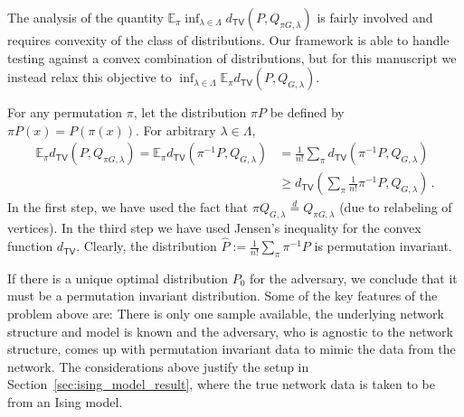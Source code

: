\documentclass[final,12pt]{colt2018}
\begin{document}
The analysis of the quantity $\mathbb{E}_\pi  \inf_{\lambda\in \Lambda} d_{\mathsf{TV}}(P, Q_{\pi G,\lambda})$ is fairly involved and requires convexity of the class of distributions. Our framework is able to handle testing against a convex combination of distributions, but for this manuscript we instead relax this objective to $\inf_{\lambda \in \Lambda} \mathbb{E}_{\pi} d_{\mathsf{TV}}(P, Q_{G,\lambda})$.
%

For any permutation $\pi$, let the distribution $\pi P$ be defined by $\pi P(x) = P(\pi(x))$. For arbitrary $\lambda \in \Lambda$,
\begin{align}
 \mathbb{E}_\pi d_{\mathsf{TV}}(P,Q_{\pi G,\lambda}) =\mathbb{E}_{\pi} d_{\mathsf{TV}}(\pi^{-1}P,Q_{G,\lambda}) \nonumber 
&=  \frac{1}{n!} \sum_{\pi}  d_{\mathsf{TV}}(\pi^{-1}P,Q_{G,\lambda}) \nonumber \\
&\geq  d_{\mathsf{TV}}\left(\sum_{\pi}\tfrac{1}{n!}\pi^{-1}P, Q_{G,\lambda}\right) \,.\label{eq:expectation_minimization}
\end{align}
In the first step, we have used the fact that $\pi Q_{G,\lambda} \stackrel{d}{=} Q_{\pi G,\lambda}$ (due to relabeling of vertices).  In the third step we have used Jensen's inequality for the convex function $d_{\mathsf{TV}}$.
Clearly, the distribution $\hat{P} := \frac{1}{n!}\sum_{\pi}\pi^{-1}P$ is permutation invariant. 

If there is a unique optimal distribution $P_0$ for the adversary, we conclude that it must be a permutation invariant distribution. Some of the key features of the problem above are:  There is only one sample available, the underlying network structure and model is known and the adversary, who is agnostic to the network structure, comes up with permutation invariant data to mimic the data from the network. The considerations above justify the setup in Section~\ref{sec:ising_model_result}, where the true network data is taken to be from an Ising model.
\end{document}
